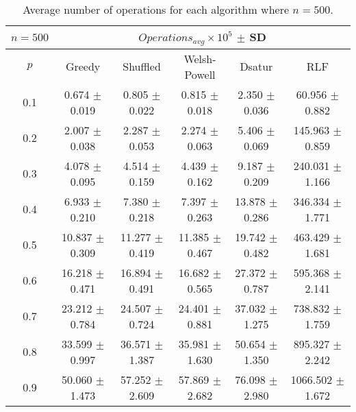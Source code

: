 \begin{table}[H]
    \centering
    \begin{tabular}{cccccc}
        
        $n = 500$& \multicolumn{5}{c}{$Operations_{avg}\times10^5$ $\pm$ SD} \\
        \hline
        $p$ & Greedy & Shuffled & Welsh-Powell & Dsatur & RLF \\
        \hline
        0.1 & 0.674 $\pm$ 0.019 & 0.805 $\pm$ 0.022 & 0.815 $\pm$ 0.018 & 2.350 $\pm$ 0.036 & 60.956 $\pm$ 0.882 \\
        0.2 & 2.007 $\pm$ 0.038 & 2.287 $\pm$ 0.053 & 2.274 $\pm$ 0.063 & 5.406 $\pm$ 0.069 & 145.963 $\pm$ 0.859 \\
        0.3 & 4.078 $\pm$ 0.095 & 4.514 $\pm$ 0.159 & 4.439 $\pm$ 0.162 & 9.187 $\pm$ 0.209 & 240.031 $\pm$ 1.166 \\
        0.4 & 6.933 $\pm$ 0.210 & 7.380 $\pm$ 0.218 & 7.397 $\pm$ 0.263 & 13.878 $\pm$ 0.286 & 346.334 $\pm$ 1.771 \\
        0.5 & 10.837 $\pm$ 0.309 & 11.277 $\pm$ 0.419 & 11.385 $\pm$ 0.467 & 19.742 $\pm$ 0.482 & 463.429 $\pm$ 1.681 \\
        0.6 & 16.218 $\pm$ 0.471 & 16.894 $\pm$ 0.491 & 16.682 $\pm$ 0.565 & 27.372 $\pm$ 0.787 & 595.368 $\pm$ 2.141 \\
        0.7 & 23.212 $\pm$ 0.784 & 24.507 $\pm$ 0.724 & 24.401 $\pm$ 0.881 & 37.032 $\pm$ 1.275 & 738.832 $\pm$ 1.759 \\
        0.8 & 33.599 $\pm$ 0.997 & 36.571 $\pm$ 1.387 & 35.981 $\pm$ 1.630 & 50.654 $\pm$ 1.350 & 895.327 $\pm$ 2.242 \\
        0.9 & 50.060 $\pm$ 1.473 & 57.252 $\pm$ 2.609 & 57.869 $\pm$ 2.682 & 76.098 $\pm$ 2.980 & 1066.502 $\pm$ 1.672 \\ 
        \hline
    \end{tabular}
    \caption{Average number of operations for each algorithm where $n = 500$.}
    \label{tab:avgOpsforV500}
\end{table}


